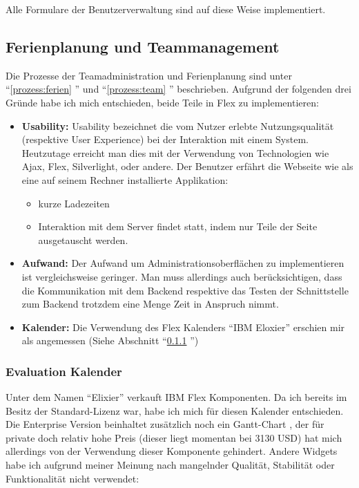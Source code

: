 Alle Formulare der Benutzerverwaltung sind auf diese Weise implementiert. 


 
\subsection{Ferienplanung und Teammanagement}\label{implementation:ferienplanung}
Die Prozesse der Teamadministration und Ferienplanung sind unter ``\ref{prozess:ferien} '' und  ``\ref{prozess:team} '' beschrieben. Aufgrund der folgenden drei Gr\"unde habe ich mich entschieden, beide Teile in Flex zu implementieren:
\begin{itemize}
\item \textbf{Usability: } Usability bezeichnet die vom Nutzer erlebte Nutzungsqualit\"at (respektive User Experience) bei der Interaktion mit einem System\cite{wiki:usability}. Heutzutage erreicht man dies mit der Verwendung von Technologien wie Ajax, Flex, Silverlight, oder andere. Der Benutzer erf\"ahrt die Webseite wie als eine auf seinem Rechner installierte Applikation:
\begin{itemize}
\item kurze Ladezeiten
\item Interaktion mit dem Server findet statt, indem nur Teile der Seite ausgetauscht werden.
\end{itemize}
\item \textbf{Aufwand: }Der Aufwand um Administrationsoberfl\"achen zu implementieren ist vergleichsweise geringer. Man muss allerdings auch ber\"ucksichtigen, dass die Kommunikation mit dem Backend respektive das Testen der Schnittstelle zum Backend trotzdem eine Menge Zeit in Anspruch nimmt.
\item \textbf{Kalender: } Die Verwendung des Flex Kalenders ``IBM Eloxier'' erschien mir als angemessen (Siehe Abschnitt ``\ref{evaluation:kalender} '')
\end{itemize}

\subsubsection{Evaluation Kalender}\label{evaluation:kalender}
Unter dem Namen ``Elixier'' verkauft IBM Flex Komponenten. Da ich bereits im Besitz der Standard-Lizenz war, habe ich mich f\"ur diesen Kalender entschieden. Die Enterprise Version beinhaltet zus\"atzlich noch ein Gantt-Chart \cite{wiki:gantt}, der f\"ur private doch relativ hohe Preis (dieser liegt momentan bei 3130 USD) hat mich allerdings von der Verwendung dieser Komponente gehindert.  Andere Widgets habe ich aufgrund meiner Meinung nach mangelnder Qualit\"at, Stabilit\"at oder Funktionalit\"at nicht verwendet:

